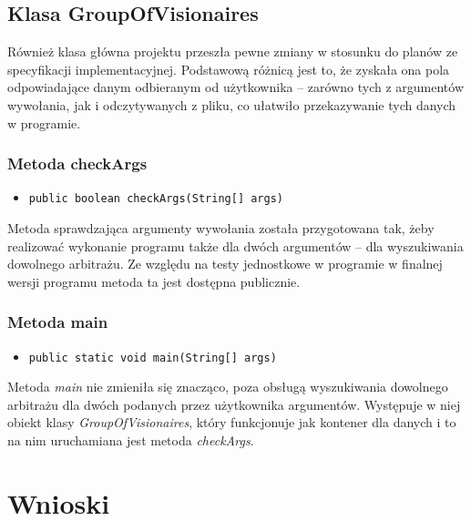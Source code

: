 \documentclass[a4paper,12pt]{article}
\newcommand\tab[1][0.6cm]{\hspace*{#1}}
\begin{document}
\subsection{Klasa GroupOfVisionaires} 

\tab Również klasa główna projektu przeszła pewne zmiany w stosunku do planów ze specyfikacji implementacyjnej. Podstawową różnicą jest to, że zyskała ona pola odpowiadające danym odbieranym od użytkownika -- zarówno tych z argumentów wywołania, jak i odczytywanych z pliku, co ułatwiło przekazywanie tych danych w programie.

\subsubsection{Metoda checkArgs}

\begin{itemize}
\item \begin{lstlisting}
public boolean checkArgs(String[] args)
\end{lstlisting}
\end{itemize}

\tab Metoda sprawdzająca argumenty wywołania została przygotowana tak, żeby realizować wykonanie programu także dla dwóch argumentów -- dla wyszukiwania dowolnego arbitrażu. Ze względu na testy jednostkowe w programie w finalnej wersji programu metoda ta jest dostępna publicznie.

\subsubsection{Metoda main}

\begin{itemize}
\item \begin{lstlisting}
public static void main(String[] args)
\end{lstlisting}
\end{itemize}

\tab Metoda \textit{main} nie zmieniła się znacząco, poza obsługą wyszukiwania dowolnego arbitrażu dla dwóch podanych przez użytkownika argumentów. Występuje w niej obiekt klasy \textit{GroupOfVisionaires}, który funkcjonuje jak kontener dla danych i to na nim uruchamiana jest metoda \textit{checkArgs}.

\section{Wnioski}
\end{document}
